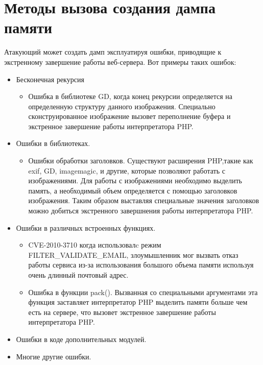 \documentclass[20pt]{article}
\begin{document}
\newpage

\section{Методы вызова создания дампа памяти}

Атакующий может создать дамп эксплуатируя ошибки, приводящие к экстренному
завершение работы веб-сервера. Вот примеры таких ошибок\cite{php-crash}:
\begin{itemize}
  \item  Бесконечная рекурсия
    \begin{itemize}
      \item Ошибка в библиотеке GD, когда конец рекурсии определяется на определенную
      структуру данного изображения. Специально сконструированное изображение вызовет
      переполнение буфера и экстренное завершение работы интерпретатора PHP.
    \end{itemize}
  \item Ошибки в библиотеках.
    \begin{itemize}
      \item Ошибки обработки заголовков. Существуют расширения PHP,такие как exif, GD,
        imagemagic, и другие, которые позволяют работать с изображениями. Для работы
        с изображениями необходимо выделить память, а необходимый объем определяется
        с помощью заголовков изображения. Таким образом выставляя специальные значения
        заголовков можно добиться экстренного завершнения работы интерпретатора PHP.
    \end{itemize}
  \item Ошибки в различных встроенных функциях.
    \begin{itemize}
      \item CVE-2010-3710\cite{cve-2010-3710} когда использовалc режим
      FILTER\_VALIDATE\_EMAIL, злоумышленник мог вызвать отказ работы сервиса
      из-за использования большого объема памяти используя очень длинный почтовый адрес.
      \item Ошибка в функции pack(). Вызванная со специальными аргументами эта функция
        заставляет интерпретатор PHP выделить памяти больше чем есть на сервере, что
        вызовет экстренное завершение работы интерпретатора PHP.
    \end{itemize}
 \item Ошибки в коде дополнительных модулей.
 \item Многие другие ошибки.
\end{itemize}
\end{document}
